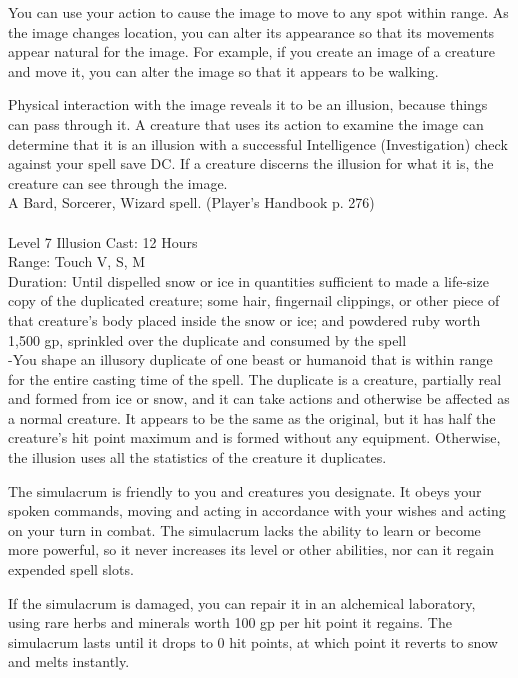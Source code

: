 \documentclass[10pt,twocolumn]{report}
\begin{document}
You can use your action to cause the image to move to any spot within range. As the image changes location, you can alter its appearance so that its movements appear natural for the image. For example, if you create an image of a creature and move it, you can alter the image so that it appears to be walking.

Physical interaction with the image reveals it to be an illusion, because things can pass through it. A creature that uses its action to examine the image can determine that it is an illusion with a successful Intelligence (Investigation) check against your spell save DC. If a creature discerns the illusion for what it is, the creature can see through the image.\\
A Bard, Sorcerer, Wizard spell. (Player's Handbook p. 276) \\


 \\
Level 7 \quad Illusion \quad Cast: 12 Hours\\
Range: Touch \quad V, S, M\\
Duration: Until dispelled \quad snow or ice in quantities sufficient to made a life-size copy of the duplicated creature; some hair, fingernail clippings, or other piece of that creature’s body placed inside the snow or ice; and powdered ruby worth 1,500 gp, sprinkled over the duplicate and consumed by the spell\\
-You shape an illusory duplicate of one beast or humanoid that is within range for the entire casting time of the spell.
The duplicate is a creature, partially real and formed from ice or snow, and it can take actions and otherwise be affected as a normal creature. It appears to be the same as the original, but it has half the creature’s hit point maximum and is formed without any equipment. Otherwise, the illusion uses all the statistics of the creature it duplicates.

The simulacrum is friendly to you and creatures you designate. It obeys your spoken commands, moving and acting in accordance with your wishes and acting on your turn in combat. The simulacrum lacks the ability to learn or become more powerful, so it never increases its level or other abilities, nor can it regain expended spell slots.

If the simulacrum is damaged, you can repair it in an alchemical laboratory, using rare herbs and minerals worth 100 gp per hit point it regains. The simulacrum lasts until it drops to 0 hit points, at which point it reverts to snow and melts instantly.
\end{document}
